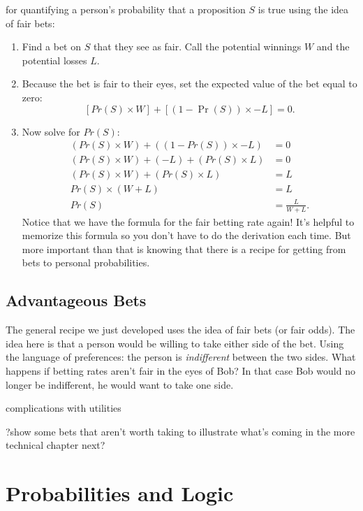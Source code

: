 \documentclass[]{tufte-book}
\providecommand{\tightlist}{%
  \setlength{\itemsep}{0pt}\setlength{\parskip}{0pt}}
\begin{document}
 for quantifying a person's probability that a proposition \(S\) is true using the idea of fair bets:

\begin{enumerate}
\def\labelenumi{\arabic{enumi}.}
\tightlist
\item
  Find a bet on \(S\) that they see as fair. Call the potential winnings \(W\) and the potential losses \(L\).
\item
  Because the bet is fair to their eyes, set the expected value of the bet equal to zero:
  \[ [Pr(S) \times W] + [(1-\Pr(S)) \times -L] = 0. \]
\item
  Now solve for \(Pr(S)\):
  \[
     \begin{aligned}
       (Pr(S) \times W)  + ((1-Pr(S)) \times -L) &= 0 \\
       (Pr(S) \times W)  + (-L) + (Pr(S) \times L) &= 0 \\
            (Pr(S) \times W) + (Pr(S) \times L) &= L \\
            Pr(S)\times (W + L) &= L \\
                                      Pr(S) &= \frac{L}{W+L}.
     \end{aligned}
   \]
  Notice that we have the formula for the fair betting rate again! It's helpful to memorize this formula so you don't have to do the derivation each time. But more important than that is knowing that there is a recipe for getting from bets to personal probabilities.
\end{enumerate}

\hypertarget{advantageous-bets}{%
\section{Advantageous Bets}\label{advantageous-bets}}

The general recipe we just developed uses the idea of fair bets (or fair odds). The idea here is that a person would be willing to take either side of the bet. Using the language of preferences: the person is \emph{indifferent} between the two sides. What happens if betting rates aren't fair in the eyes of Bob? In that case Bob would no longer be indifferent, he would want to take one side.

complications with utilities

?show some bets that aren't worth taking to illustrate what's coming in the more technical chapter next?

\hypertarget{probabilities-and-logic}{%
\chapter{Probabilities and Logic}\label{probabilities-and-logic}}
\end{document}
